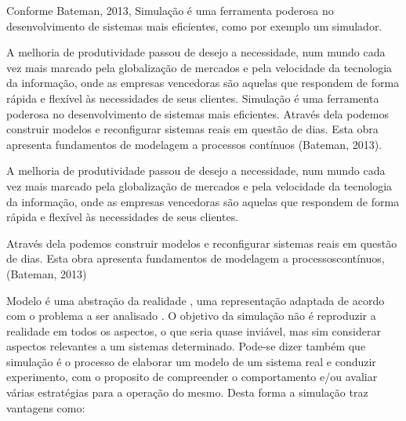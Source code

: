 \documentclass[12pt]{article}
\begin{document}
Conforme Bateman, 2013, Simulação é uma ferramenta poderosa no 
desenvolvimento de sistemas mais eficientes, como por exemplo um simulador.

A melhoria de produtividade passou de desejo a necessidade, num mundo cada 
vez mais marcado pela globalização de mercados e pela velocidade da
tecnologia da informação, onde as empresas vencedoras são aquelas que
respondem de forma rápida e flexível às necessidades de seus clientes.
Simulação é uma ferramenta poderosa no desenvolvimento de sistemas mais
eficientes. Através dela podemos construir modelos e reconfigurar
sistemas reais em questão de dias. Esta obra apresenta fundamentos de
modelagem a processos contínuos (Bateman, 2013).

A melhoria de produtividade passou de desejo a necessidade, num mundo 
cada vez mais marcado pela globalização de mercados e pela velocidade
da tecnologia da informação, onde as empresas vencedoras são aquelas
que respondem de forma rápida e flexível às necessidades de seus clientes. 


Através dela podemos construir modelos e reconfigurar sistemas
reais em questão de dias. Esta obra apresenta fundamentos de modelagem 
a processoscontínuos, (Bateman, 2013)


Modelo é uma abstração da realidade , uma representação adaptada de acordo
com o problema a ser analisado . O objetivo da simulação não é reproduzir
a realidade em todos os aspectos, o que seria quase inviável, mas sim 
considerar aspectos relevantes a um sistemas determinado. Pode-se dizer
também que simulação é o processo de elaborar um modelo de um sistema
real e conduzir experimento, com o proposito de compreender o comportamento
e/ou avaliar várias estratégias para a operação do mesmo. Desta forma a
simulação traz vantagens como:
\end{document}
